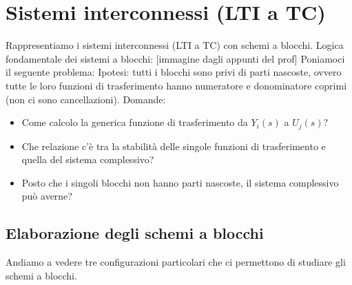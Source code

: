 \section{Sistemi interconnessi (LTI a TC)}
Rappresentiamo i sistemi interconnessi (LTI a TC) con schemi a blocchi.\newline
\newline
Logica fondamentale dei sistemi a blocchi:
[immagine dagli appunti del prof]\newline
\newline
Poniamoci il seguente problema:\newline
Ipotesi: tutti i blocchi sono privi di parti nascoste, ovvero tutte le loro funzioni di trasferimento hanno numeratore e donominatore coprimi (non ci sono cancellazioni).\newline
Domande:
\begin{itemize}
    \item Come calcolo la generica funzione di trasferimento da $Y_i(s)$ a $U_j(s)$?
    \item Che relazione c'è tra la stabilità delle singole funzioni di trasferimento e quella del sistema complessivo?
    \item Posto che i singoli blocchi non hanno parti nascoste, il sistema complessivo può averne?
\end{itemize}
\subsection{Elaborazione degli schemi a blocchi}
Andiamo a vedere tre configurazioni particolari che ci permettono di studiare gli schemi a blocchi.
